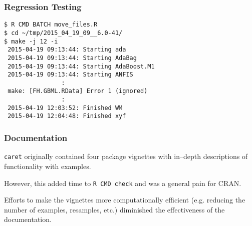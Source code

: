\documentclass[12 pt]{beamer}\usepackage[]{graphicx}\usepackage[]{color}
\newcommand{\pkg}[1]{{\fontseries{b}\selectfont #1}}
\renewcommand{\pkg}[1]{{\color{darkgreen}\texttt{#1}}}
\begin{document}

  \begin{frame}[fragile]
\frametitle{Regression Testing}

\begin{Verbatim}[fontsize=\footnotesize]
$ R CMD BATCH move_files.R
$ cd ~/tmp/2015_04_19_09__6.0-41/
$ make -j 12 -i
 2015-04-19 09:13:44: Starting ada
 2015-04-19 09:13:44: Starting AdaBag
 2015-04-19 09:13:44: Starting AdaBoost.M1
 2015-04-19 09:13:44: Starting ANFIS
                :
 make: [FH.GBML.RData] Error 1 (ignored)
                :
 2015-04-19 12:03:52: Finished WM
 2015-04-19 12:04:48: Finished xyf
\end{Verbatim}

\end{frame}




  \begin{frame}[fragile]
\frametitle{Documentation}

\pkg{caret} originally contained four package vignettes with in--depth descriptions of functionality with examples.

\vspace{.15in}

However, this added time to \texttt{R CMD check} and was a general pain for CRAN.

\vspace{.15in}

Efforts to make the vignettes more computationally efficient (e.g. reducing the number of examples, resamples, etc.) diminished the effectiveness of the documentation.


\end{frame}

\end{document}

